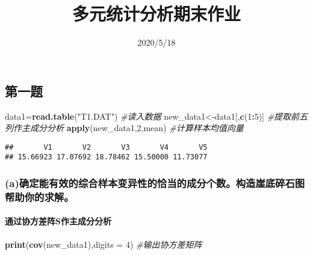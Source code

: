 \documentclass[
]{article}
\title{多元统计分析期末作业}
\author{}
\date{\vspace{-2.5em}2020/5/18}
\newenvironment{Shaded}{\begin{snugshade}}{\end{snugshade}}
\newcommand{\CommentTok}[1]{\textcolor[rgb]{0.56,0.35,0.01}{\textit{#1}}}
\newcommand{\DataTypeTok}[1]{\textcolor[rgb]{0.13,0.29,0.53}{#1}}
\newcommand{\DecValTok}[1]{\textcolor[rgb]{0.00,0.00,0.81}{#1}}
\newcommand{\KeywordTok}[1]{\textcolor[rgb]{0.13,0.29,0.53}{\textbf{#1}}}
\newcommand{\NormalTok}[1]{#1}
\newcommand{\OperatorTok}[1]{\textcolor[rgb]{0.81,0.36,0.00}{\textbf{#1}}}
\newcommand{\StringTok}[1]{\textcolor[rgb]{0.31,0.60,0.02}{#1}}
\begin{document}
\maketitle

\hypertarget{ux7b2cux4e00ux9898}{%
\subsection{第一题}\label{ux7b2cux4e00ux9898}}

\begin{Shaded}
\begin{Highlighting}[]
\NormalTok{data1=}\KeywordTok{read.table}\NormalTok{(}\StringTok{"T1.DAT"}\NormalTok{)   }\CommentTok{#读入数据}
\NormalTok{new_data1<-data1[,}\KeywordTok{c}\NormalTok{(}\DecValTok{1}\OperatorTok{:}\DecValTok{5}\NormalTok{)]    }\CommentTok{#提取前五列作主成分分析}
\KeywordTok{apply}\NormalTok{(new_data1,}\DecValTok{2}\NormalTok{,mean)    }\CommentTok{#计算样本均值向量}
\end{Highlighting}
\end{Shaded}

\begin{verbatim}
##       V1       V2       V3       V4       V5 
## 15.66923 17.07692 18.78462 15.50000 11.73077
\end{verbatim}

\hypertarget{aux786eux5b9aux80fdux6709ux6548ux7684ux7efcux5408ux6837ux672cux53d8ux5f02ux6027ux7684ux6070ux5f53ux7684ux6210ux5206ux4e2aux6570ux6784ux9020ux5d16ux5e95ux788eux77f3ux56feux5e2eux52a9ux4f60ux7684ux6c42ux89e3}{%
\subsubsection{(a)确定能有效的综合样本变异性的恰当的成分个数。构造崖底碎石图帮助你的求解。}\label{aux786eux5b9aux80fdux6709ux6548ux7684ux7efcux5408ux6837ux672cux53d8ux5f02ux6027ux7684ux6070ux5f53ux7684ux6210ux5206ux4e2aux6570ux6784ux9020ux5d16ux5e95ux788eux77f3ux56feux5e2eux52a9ux4f60ux7684ux6c42ux89e3}}

\hypertarget{ux901aux8fc7ux534fux65b9ux5deeux9635sux4f5cux4e3bux6210ux5206ux5206ux6790}{%
\paragraph{通过协方差阵S作主成分分析}\label{ux901aux8fc7ux534fux65b9ux5deeux9635sux4f5cux4e3bux6210ux5206ux5206ux6790}}

\begin{Shaded}
\begin{Highlighting}[]
\KeywordTok{print}\NormalTok{(}\KeywordTok{cov}\NormalTok{(new_data1),}\DataTypeTok{digits =} \DecValTok{4}\NormalTok{) }\CommentTok{#输出协方差矩阵}
\end{Highlighting}
\end{Shaded}
\end{document}
